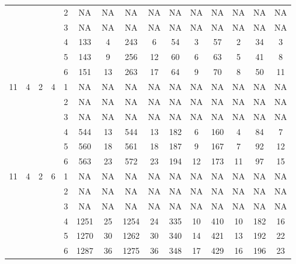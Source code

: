 \begin{longtable}{|c|c|c|c|c|c c|c c|c c|c c|c c|}
 & & & & 2 & NA & NA & NA & NA & NA & NA & NA & NA & NA & NA \\
 & & & & 3 & NA & NA & NA & NA & NA & NA & NA & NA & NA & NA \\
 & & & & 4 & 133 & 4 & 243 & 6 & 54 & 3 & 57 & 2 & 34 & 3 \\
 & & & & 5 & 143 & 9 & 256 & 12 & 60 & 6 & 63 & 5 & 41 & 8 \\
 & & & & 6 & 151 & 13 & 263 & 17 & 64 & 9 & 70 & 8 & 50 & 11 \\
\hline
\multirow{6}{*}{11} & \multirow{6}{*}{4} & \multirow{6}{*}{2} & \multirow{6}{*}{4} & 1 & NA & NA & NA & NA & NA & NA & NA & NA & NA & NA \\
 & & & & 2 & NA & NA & NA & NA & NA & NA & NA & NA & NA & NA \\
 & & & & 3 & NA & NA & NA & NA & NA & NA & NA & NA & NA & NA \\
 & & & & 4 & 544 & 13 & 544 & 13 & 182 & 6 & 160 & 4 & 84 & 7 \\
 & & & & 5 & 560 & 18 & 561 & 18 & 187 & 9 & 167 & 7 & 92 & 12 \\
 & & & & 6 & 563 & 23 & 572 & 23 & 194 & 12 & 173 & 11 & 97 & 15 \\
\hline
\multirow{6}{*}{11} & \multirow{6}{*}{4} & \multirow{6}{*}{2} & \multirow{6}{*}{6} & 1 & NA & NA & NA & NA & NA & NA & NA & NA & NA & NA \\
 & & & & 2 & NA & NA & NA & NA & NA & NA & NA & NA & NA & NA \\
 & & & & 3 & NA & NA & NA & NA & NA & NA & NA & NA & NA & NA \\
 & & & & 4 & 1251 & 25 & 1254 & 24 & 335 & 10 & 410 & 10 & 182 & 16 \\
 & & & & 5 & 1270 & 30 & 1262 & 30 & 340 & 14 & 421 & 13 & 192 & 22 \\
 & & & & 6 & 1287 & 36 & 1275 & 36 & 348 & 17 & 429 & 16 & 196 & 23 \\
\hline
\end{longtable}
